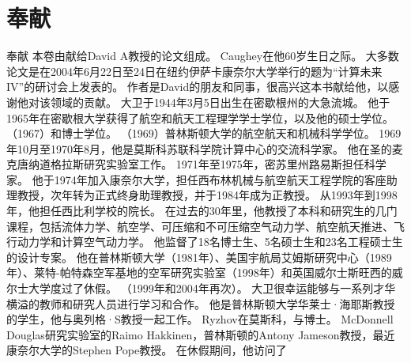 \documentclass[UTF8,11pt,a4paper,openany,fontset=fandol]{ctexbook}
\begin{document}
\chapter*{奉献}
奉献 本卷由献给David A教授的论文组成。 Caughey在他60岁生日之际。 大多数论文是在2004年6月22日至24日在纽约伊萨卡康奈尔大学举行的题为“计算未来IV”的研讨会上发表的。 作者是David的朋友和同事，很高兴这本书献给他，以感谢他对该领域的贡献。 大卫于1944年3月5日出生在密歇根州的大急流城。 他于1965年在密歇根大学获得了航空和航天工程理学学士学位，以及他的硕士学位。 （1967）和博士学位。 （1969）普林斯顿大学的航空航天和机械科学学位。 1969年10月至1970年8月，他是莫斯科苏联科学院计算中心的交流科学家。 他在圣的麦克唐纳道格拉斯研究实验室工作。 1971年至1975年，密苏里州路易斯担任科学家。 他于1974年加入康奈尔大学，担任西布林机械与航空航天工程学院的客座助理教授，次年转为正式终身助理教授，并于1984年成为正教授。 从1993年到1998年，他担任西比利学校的院长。 在过去的30年里，他教授了本科和研究生的几门课程，包括流体力学、航空学、可压缩和不可压缩空气动力学、航空航天推进、飞行动力学和计算空气动力学。 他监督了18名博士生、5名硕士生和23名工程硕士生的设计专案。 他在普林斯顿大学（1981年）、美国宇航局艾姆斯研究中心（1989年）、莱特-帕特森空军基地的空军研究实验室（1998年）和英国威尔士斯旺西的威尔士大学度过了休假。 （1999年和2004年再次）。 大卫很幸运能够与一系列才华横溢的教师和研究人员进行学习和合作。 他是普林斯顿大学华莱士·海耶斯教授的学生，他与奥列格·S教授一起工作。 Ryzhov在莫斯科，与博士。 McDonnell Douglas研究实验室的Raimo Hakkinen，普林斯顿的Antony Jameson教授，最近康奈尔大学的Stephen Pope教授。 在休假期间，他访问了
\end{document}
